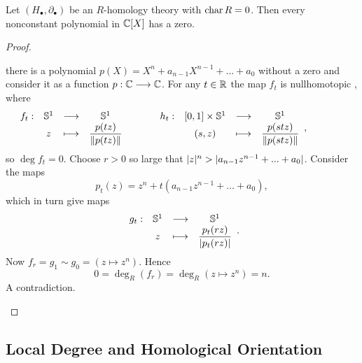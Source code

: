 	\begin{theorem}
		Let $(H_\bullet, \partial_\bullet)$ be an $R$-homology theory with $\operatorname{char} R = 0$. Then every nonconstant polynomial in $\mathbb{C}[X]$ has a zero.
	\end{theorem}
	\begin{proof}
		\begin{assume}
			there is a polynomial $p(X) = X^n + a_{n-1}X^{n-1} + ... + a_0$ without a zero and consider it as a function $p:\mathbb{C} --> \mathbb{C}$.
			For any $t \in \mathbb{R}$ the map $f_t$ is nullhomotopic , where
			\begin{equation*}
				\begin{array}{rccc}
					f_t: &\mathbb{S}^1 & \longrightarrow & \mathbb{S}^1\\
					&z & \longmapsto & \dfrac{p(tz)}{\Vert p(tz) \Vert}
				\end{array}
				\hspace{1cm}
				\begin{array}{rccc}
					h_t: &[0,1] \times \mathbb{S}^1 & \longrightarrow & \mathbb{S}^1\\
					 &(s,z) & \longmapsto & \dfrac{p(stz)}{\Vert p(stz) \Vert}
				\end{array},
				\hspace{1.5cm}
			\end{equation*}
			so $\deg f_t = 0$. Choose $r>0$ so large that $\vert z \vert^n > \vert a_{n-1}z^{n-1} + ... + a_0 \vert$. Consider the maps
			\begin{equation*}
				p_t(z) = z^n + t(a_{n-1}z^{n-1} + ... + a_0),
			\end{equation*}
			which in turn give maps
			\begin{equation*}
				\begin{array}{rccc}
					g_t: & \mathbb{S}^1 & \longrightarrow & \mathbb{S}^1\\
					& z & \longmapsto & \dfrac{p_t(r z)}{\vert p_t(rz) \vert}
				\end{array}.
			\end{equation*}
			Now $f_r = g_1 \sim g_0 = (z \mapsto z^n)$. Hence
			\begin{equation*}
				0 = \deg_R(f_r) = \deg_R(z \mapsto z^n) = n.
			\end{equation*}
			A contradiction.\vspace{-2em}
		\end{assume}
	\end{proof}

	\newpage
	\subsection{Local Degree and Homological Orientation}

